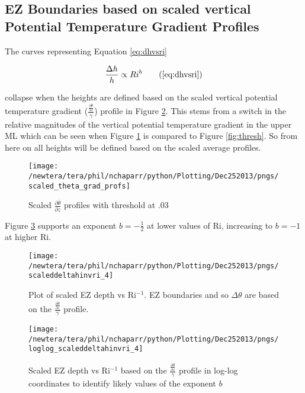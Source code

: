 \clearpage
\subsection{\acs{EZ} Boundaries based on scaled vertical Potential Temperature Gradient Profiles}
\label{subsec:ellimscaledprof}

The curves representing Equation \ref{eq:dhvsri} 

\begin{equation}
\frac{\Delta h}{h} \propto Ri ^{b} \tag{\ref{eq:dhvsri}}
\end{equation}

collapse when the heights are defined based on the scaled vertical potential temperature gradient 
($\frac{\frac{\partial \overline{\theta}}{\partial z}}{\gamma}$) profile in Figure \ref{fig:deltahinvri_scaled}.  This stems
from a switch in the relative magnitudes of the vertical potential temperature gradient in the upper \acs{ML} which can be seen when Figure \ref{fig:thresh3} is compared to Figure \ref{fig:thresh}. So from here on all heights will be defined based on the scaled average profiles.   
\\

\begin{figure}[htbp]
    \centering
    \texttt{[image: /newtera/tera/phil/nchaparr/python/Plotting/Dec252013/pngs/scaled\_theta\_grad\_profs]}
    \caption{Scaled $\frac{\partial \overline{\theta}}{\partial z}$ profiles with threshold at .03}
    \label{fig:thresh3}   %
\end{figure}

Figure \ref{fig:loglogdeltahinvri} supports an exponent $b = -\frac{1}{2}$ at lower values of \acs{Ri}, increasing to $b = -1$ at higher \acs{Ri}.    

\clearpage

\begin{figure}[t]
    \centering
    \texttt{[image: /newtera/tera/phil/nchaparr/python/Plotting/Dec252013/pngs/scaleddeltahinvri\_4]}
    \caption[scaled \acs{EZ} depth vs \acs{Ri}$^{-1}$]{Plot of scaled \acs{EZ} depth vs \acs{Ri}$^{-1}$. \acs{EZ} boundaries and so $\Delta \theta$ are based on the $\frac{\frac{\partial \overline{\theta}}{\partial z}}{\gamma}$ profile.}
    \label{fig:deltahinvri_scaled}   %
\end{figure}                      
\vspace{-50mm}
\begin{figure}[b]
\centering
\texttt{[image: /newtera/tera/phil/nchaparr/python/Plotting/Dec252013/pngs/loglog\_scaleddeltahinvri\_4]}\\
\caption[Log-log plot of scaled \acs{EZ} depth vs \acs{Ri}$^{-1}$]{Scaled \acs{EZ} depth vs \acs{Ri}$^{-1}$ based on the $\frac{\frac{\partial \overline{\theta}}{\partial z}}{\gamma}$ profile in log-log coordinates to identify likely values of the exponent $b$}
\label{fig:loglogdeltahinvri}
\end{figure}

